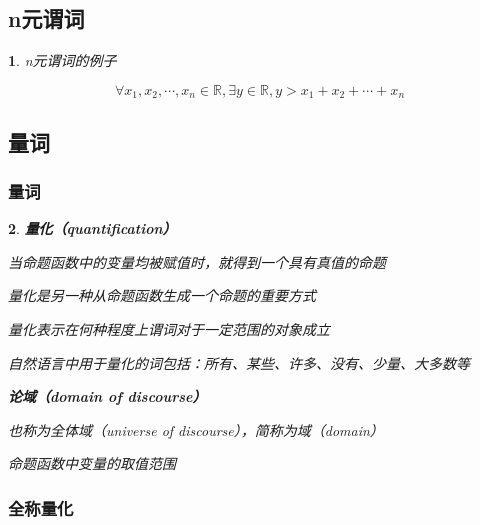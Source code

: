\documentclass[UTF8]{report}
\def\R{\mathbb{R}}
\theoremstyle{MyLineTheoremStyle} %
\theoremstyle{MyBlockTheoremStyle} %
\theoremstyle{MySubsubsectionStyle} %
\newtheorem{definition}{}
\begin{document}
\subsection{n元谓词}

\begin{definition}
    n元谓词的例子\par
    \begin{equation}
        \forall x_1, x_2, \cdots, x_n \in \R, \exists y \in \R, y > x_1 + x_2 + \cdots + x_n
    \end{equation}
\end{definition}

\subsection{量词}

\subsubsection{量词}

\begin{definition}
    \textbf{量化（quantification）}\par
    当命题函数中的变量均被赋值时，就得到一个具有真值的命题\par
    量化是另一种从命题函数生成一个命题的重要方式\par
    量化表示在何种程度上谓词对于一定范围的对象成立\par
    自然语言中用于量化的词包括：所有、某些、许多、没有、少量、大多数等\par

    \textbf{论域（domain of discourse）}\par
    也称为全体域（universe of discourse），简称为域（domain）\par
    命题函数中变量的取值范围\par
\end{definition}

\subsubsection{全称量化}
\end{document}

